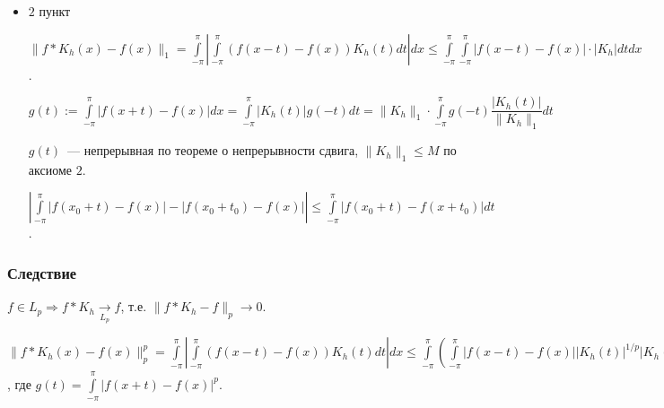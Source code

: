 \documentclass{article}
\begin{document}
\begin{itemize}
                        $\left| I_2 \right| \leqslant \int\limits_{E_{\delta}} | \ldots | \leqslant \mathrm{essup} |K_h| \int\limits_{E_{\delta}} |f(x - t)| * |f(x)| dt \leqslant \mathrm{essup} |K_h| \left( \| f \|_1 + 2 \pi | f(x) | \right)$
                        
                        $\left| f * K_h - f \right| \leqslant \left| I_1 \right| + \left| I_2 \right| < \varepsilon$.
                
                \item $2$ пункт
                
                    $\| f * K_h(x) - f(x) \|_1 = \int\limits^{\pi}_{-\pi} \left| \int\limits^{\pi}_{-\pi} \left( f(x - t) - f(x) \right) K_h(t) dt \right| dx \leqslant \int\limits^{\pi}_{-\pi} \int\limits^{\pi}_{-\pi} \left| f(x - t) - f(x) \right| \cdot |K_h| dt dx$.
                    
                    $g(t) := \int\limits^{\pi}_{-\pi} \left| f(x + t) - f(x) \right| dx = \int\limits^{\pi}_{-\pi} | K_h(t) | g(-t) dt = \| K_h \|_1 \cdot \int\limits^{\pi}_{-\pi} g(-t) \dfrac{|K_h(t)|}{\| K_h \|_1} dt$
                    
                    $g(t)$~--- непрерывная по теореме о непрерывности сдвига, $\| K_h \|_1 \leqslant M$ по аксиоме $2$.
                    
                    $\left| \int\limits^{\pi}_{-\pi} | f(x_0 + t) - f(x) | - | f(x_0 + t_0) - f(x) | \right| \leqslant \int\limits^{\pi}_{-\pi} \left| f(x_0 + t) - f(x + t_0) \right| dt$.
                    
                    
                    
            \end{itemize}
            
        \subsubsection{Следствие}
        
            $f \in L_p \Rightarrow f * K_h \xrightarrow[L_p]{} f$, т.е. $\| f * K_h - f \| _p \rightarrow 0$.
            
            $\| f * K_h(x) - f(x) \|^p_p = \int\limits^{\pi}_{-\pi} \left| \int\limits^{\pi}_{-\pi} \left( f(x - t) - f(x) \right) K_h(t) dt \right| dx \leqslant \int\limits^{\pi}_{-\pi} \left( \int\limits^{\pi}_{-\pi} | f(x - t) - f(x) | | K_h(t) |^{1/p} | K_h(t) |^{1/q} dt \right)^p dx \leqslant \int\limits^{\pi}_{-\pi} \left( \int\limits^{\pi}_{-\pi} | f(x - t) - f(x) |^p \cdot | K_h(t) | \right) \cdot \| K_h \|^{p/q}_1 dx = \| K_h \|^{p/q}_1 \int\limits^{\pi}_{-\pi} g(-t) \dfrac{|K_h(t)|}{\| K_h \|_1} dt$, где $g(t) = \int\limits^{\pi}_{-\pi} | f(x + t) - f(x) |^p$.
            
\end{document}
